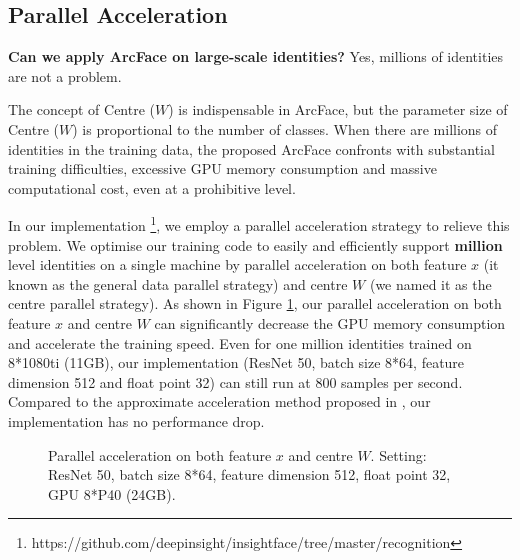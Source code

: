 \documentclass[10pt,twocolumn,letterpaper]{article}
\begin{document}
\subsection{Parallel Acceleration}

{\bf Can we apply ArcFace on large-scale identities?} Yes, millions of identities are not a problem.

The concept of Centre ($W$) is indispensable in ArcFace, but the parameter size of Centre ($W$) is proportional to the number of classes. When there are millions of identities in the training data, the proposed ArcFace confronts with substantial training difficulties, \eg excessive GPU memory consumption and massive computational cost, even at a prohibitive level.

In our implementation \footnote{https://github.com/deepinsight/insightface/tree/master/recognition}, we employ a parallel acceleration strategy \cite{debingzhang} to relieve this problem. We optimise our training code to easily and efficiently support {\bf million} level identities on a single machine by parallel acceleration on both feature $x$ (it known as the general data parallel strategy) and centre $W$ (we named it as the centre parallel strategy). As shown in Figure \ref{fig:parallel}, our parallel acceleration on both feature $x$ and centre $W$ can significantly decrease the GPU memory consumption and accelerate the training speed. Even for one million identities trained on 8*1080ti (11GB), our implementation (ResNet 50, batch size 8*64, feature dimension 512 and float point 32) can still run at 800 samples per second. Compared to the approximate acceleration method proposed in \cite{zhang2018accelerated}, our implementation has no performance drop.

\begin{figure}[h!]
\small
\centering
{}
\caption{Parallel acceleration on both feature $x$ and centre $W$. Setting: ResNet 50, batch size 8*64, feature dimension 512, float point 32, GPU 8*P40 (24GB).}
\label{fig:parallel}
\end{figure}
\end{document}

